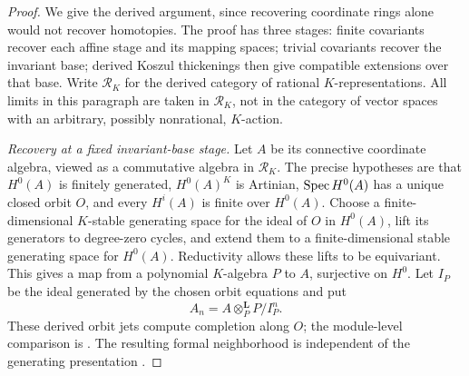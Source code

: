 \begin{proof}
We give the derived argument, since recovering coordinate rings alone
would not recover homotopies. The proof has three stages: finite
covariants recover each affine stage and its mapping spaces; trivial
covariants recover the invariant base; derived Koszul thickenings then
give compatible extensions over that base.
Write $\mathcal R_K$ for the derived
category of rational $K$-representations. All limits in this paragraph
are taken in $\mathcal R_K$, not in the category of vector spaces with
an arbitrary, possibly nonrational, $K$-action.

\emph{Recovery at a fixed invariant-base stage.}
Let $A$ be its connective coordinate algebra, viewed as a commutative
algebra in $\mathcal R_K$. The precise hypotheses are that $H^0(A)$
is finitely generated, $H^0(A)^K$ is Artinian,
$\operatorname{Spec} H^0(A)$ has a unique closed orbit $O$, and every $H^i(A)$
is finite over $H^0(A)$. Choose a
finite-dimensional $K$-stable generating space for the ideal of $O$
in $H^0(A)$, lift its generators to degree-zero cycles, and extend
them to a finite-dimensional stable generating space for $H^0(A)$.
Reductivity allows these lifts to be equivariant. This gives a map
from a polynomial $K$-algebra $P$ to $A$, surjective on $H^0$.
Let $I_P$ be the ideal generated by the chosen orbit equations and put
\[
 A_n=A\otimes_P^{\mathbf L}P/I_P^n.
\]
These derived orbit jets compute completion along $O$; the
module-level comparison is \cite[Tag~0BKH]{Stacks}.
The resulting formal neighborhood is independent of the generating
presentation \cite[Theorem~A.1.3(c) and \S A.1.5]{AGKRRV1}.


\end{proof}
